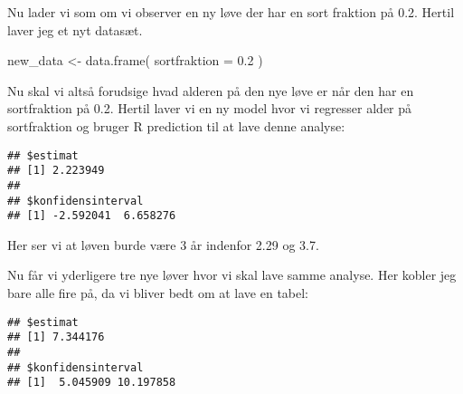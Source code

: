 \documentclass[
]{article}
\newenvironment{Shaded}{\begin{snugshade}}{\end{snugshade}}
\newcommand{\AttributeTok}[1]{\textcolor[rgb]{0.77,0.63,0.00}{#1}}
\newcommand{\FloatTok}[1]{\textcolor[rgb]{0.00,0.00,0.81}{#1}}
\newcommand{\FunctionTok}[1]{\textcolor[rgb]{0.00,0.00,0.00}{#1}}
\newcommand{\NormalTok}[1]{#1}
\newcommand{\OtherTok}[1]{\textcolor[rgb]{0.56,0.35,0.01}{#1}}
\newcommand{\SpecialCharTok}[1]{\textcolor[rgb]{0.00,0.00,0.00}{#1}}
\newcommand{\StringTok}[1]{\textcolor[rgb]{0.31,0.60,0.02}{#1}}
\begin{document}
Nu lader vi som om vi observer en ny løve der har en sort fraktion på
0.2. Hertil laver jeg et nyt datasæt.

\begin{Shaded}
\begin{Highlighting}[]
\NormalTok{new\_data }\OtherTok{\textless{}{-}} \FunctionTok{data.frame}\NormalTok{(}
  \AttributeTok{sortfraktion =} \FloatTok{0.2}
\NormalTok{)}
\end{Highlighting}
\end{Shaded}

Nu skal vi altså forudsige hvad alderen på den nye løve er når den har
en sortfraktion på 0.2. Hertil laver vi en ny model hvor vi regresser
alder på sortfraktion og bruger R prediction til at lave denne analyse:

\begin{Shaded}
\end{Shaded}

\begin{verbatim}
## $estimat
## [1] 2.223949
## 
## $konfidensinterval
## [1] -2.592041  6.658276
\end{verbatim}

Her ser vi at løven burde være 3 år indenfor 2.29 og 3.7.

Nu får vi yderligere tre nye løver hvor vi skal lave samme analyse. Her
kobler jeg bare alle fire på, da vi bliver bedt om at lave en tabel:

\begin{Shaded}
\end{Shaded}

\begin{verbatim}
## $estimat
## [1] 7.344176
## 
## $konfidensinterval
## [1]  5.045909 10.197858
\end{verbatim}
\end{document}
